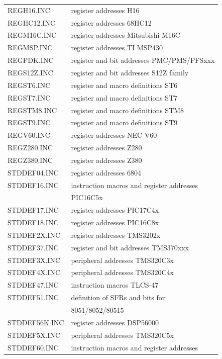 \documentclass[12pt,twoside]{report}
\begin{document}
\begin{center}
\begin{longtable}{|l|l|}
REGH16.INC        & register addresses H16\\
REGHC12.INC       & register addresses 68HC12 \\
REGM16C.INC       & register addresses Mitsubishi M16C \\
REGMSP.INC        & register addresses TI MSP430 \\
REGPDK.INC        & register and bit addresses PMC/PMS/PFSxxx \\
REGS12Z.INC       & register and bit addresses S12Z family \\
REGST6.INC        & register and macro definitions ST6 \\
REGST7.INC        & register and macro definitions ST7 \\
REGSTM8.INC       & register and macro definitions STM8 \\
REGST9.INC        & register and macro definitions ST9 \\
REGV60.INC        & register addresses NEC V60 \\
REGZ280.INC       & register addresses Z280 \\
REGZ380.INC       & register addresses Z380 \\
STDDEF04.INC      & register addresses 6804 \\
STDDEF16.INC      & instruction macros and register addresses \\
                  & PIC16C5x \\
STDDEF17.INC      & register addresses PIC17C4x \\
STDDEF18.INC      & register addresses PIC16C8x \\
STDDEF2X.INC      & register addresses TMS3202x \\
STDDEF37.INC      & register and bit addresses TMS370xxx \\
STDDEF3X.INC      & peripheral addresses TMS320C3x \\
STDDEF4X.INC      & peripheral addresses TMS320C4x \\
STDDEF47.INC      & instruction macros TLCS-47 \\
STDDEF51.INC      & definition of SFRs and bits for \\
                  & 8051/8052/80515 \\
STDDEF56K.INC     & register addresses DSP56000 \\
STDDEF5X.INC      & peripheral addresses TMS320C5x \\
STDDEF60.INC      & instruction macros and register addresses \\

\end{longtable}
\end{center}
\end{document}
